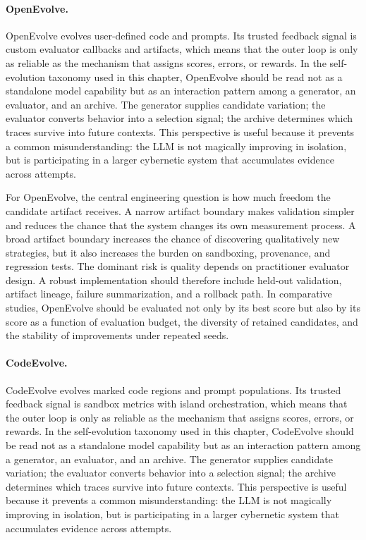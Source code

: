 \paragraph{OpenEvolve.} OpenEvolve evolves user-defined code and prompts.  Its trusted feedback signal is custom evaluator callbacks and artifacts, which means that the outer loop is only as reliable as the mechanism that assigns scores, errors, or rewards.  In the self-evolution taxonomy used in this chapter, OpenEvolve should be read not as a standalone model capability but as an interaction pattern among a generator, an evaluator, and an archive.  The generator supplies candidate variation; the evaluator converts behavior into a selection signal; the archive determines which traces survive into future contexts.  This perspective is useful because it prevents a common misunderstanding: the LLM is not magically improving in isolation, but is participating in a larger cybernetic system that accumulates evidence across attempts.

For OpenEvolve, the central engineering question is how much freedom the candidate artifact receives.  A narrow artifact boundary makes validation simpler and reduces the chance that the system changes its own measurement process.  A broad artifact boundary increases the chance of discovering qualitatively new strategies, but it also increases the burden on sandboxing, provenance, and regression tests.  The dominant risk is quality depends on practitioner evaluator design.  A robust implementation should therefore include held-out validation, artifact lineage, failure summarization, and a rollback path.  In comparative studies, OpenEvolve should be evaluated not only by its best score but also by its score as a function of evaluation budget, the diversity of retained candidates, and the stability of improvements under repeated seeds.

\paragraph{CodeEvolve.} CodeEvolve evolves marked code regions and prompt populations.  Its trusted feedback signal is sandbox metrics with island orchestration, which means that the outer loop is only as reliable as the mechanism that assigns scores, errors, or rewards.  In the self-evolution taxonomy used in this chapter, CodeEvolve should be read not as a standalone model capability but as an interaction pattern among a generator, an evaluator, and an archive.  The generator supplies candidate variation; the evaluator converts behavior into a selection signal; the archive determines which traces survive into future contexts.  This perspective is useful because it prevents a common misunderstanding: the LLM is not magically improving in isolation, but is participating in a larger cybernetic system that accumulates evidence across attempts.

